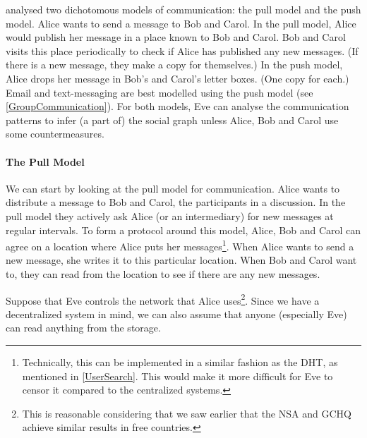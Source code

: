 \textcite{PPACinPubFS} analysed two dichotomous models of communication: the 
pull model and the push model.
Alice wants to send a message to Bob and Carol.
In the pull model, Alice would publish her message in a place known to Bob and 
Carol.
Bob and Carol visits this place periodically to check if Alice has published 
any new messages.
(If there is a new message, they make a copy for themselves.)
In the push model, Alice drops her message in Bob's and Carol's letter boxes.
(One copy for each.)
Email and text-messaging are best modelled using the push model (see 
\cref{GroupCommunication}).
For both models, Eve can analyse the communication patterns to infer (a part 
of) the social graph unless Alice, Bob and Carol use some countermeasures.


\paragraph{The Pull Model}

We can start by looking at the pull model for communication.
Alice wants to distribute a message to Bob and Carol, the participants in 
a discussion.
In the pull model they actively ask Alice (or an intermediary) for new messages 
at regular intervals.
To form a protocol around this model, Alice, Bob and Carol can agree on 
a location where Alice puts her messages\footnote{%
  Technically, this can be implemented in a similar fashion as the \ac{DHT}, as 
  mentioned in \cref{UserSearch}.
  This would make it more difficult for Eve to censor it compared to the 
  centralized systems.
}.
When Alice wants to send a new message, she writes it to this particular 
location.
When Bob and Carol want to, they can read from the location to see if there are 
any new messages.

Suppose that Eve controls the network that Alice uses\footnote{%
  This is reasonable considering that we saw earlier that the \ac{NSA} and 
  \ac{GCHQ} achieve similar results in free countries.
}.
Since we have a decentralized system in mind, we can also assume that anyone 
(especially Eve) can read anything from the storage.

